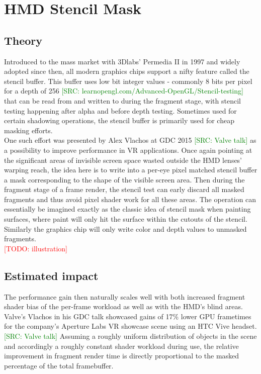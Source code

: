 
\section{HMD Stencil Mask} \label{stencilmask}
\subsection{Theory}
Introduced to the mass market with 3Dlabs' Permedia II in 1997 and widely adopted since then, all modern graphics chips support a nifty feature called the stencil buffer. This buffer uses low bit integer values - commonly 8 bits per pixel for a depth of 256 \textcolor{green}{[SRC: learnopengl.com/Advanced-OpenGL/Stencil-testing]} that can be read from and written to during the fragment stage, with stencil testing happening after alpha and before depth testing. Sometimes used for certain shadowing operations, the stencil buffer is primarily used for cheap masking efforts. \\
One such effort was presented by Alex Vlachos at GDC 2015 \textcolor{green}{[SRC: Valve talk]} as a possibility to improve performance in VR applications. Once again pointing at the significant areas of invisible screen space wasted outside the HMD lenses' warping reach, the idea here is to write into a per-eye pixel matched stencil buffer a mask corresponding to the shape of the visible screen area. Then during the fragment stage of a frame render, the stencil test can early discard all masked fragments and thus avoid pixel shader work for all these areas. The operation can essentially be imagined exactly as the classic idea of stencil mask when painting surfaces, where paint will only hit the surface within the cutouts of the stencil. Similarly the graphics chip will only write color and depth values to unmasked fragments. \\

\textcolor{red}{[TODO: illustration]}

\subsection{Estimated impact}
The performance gain then naturally scales well with both increased fragment shader bias of the per-frame workload as well as with the HMD's blind areas. Valve's Vlachos in his GDC talk showcased gains of 17\% lower GPU frametimes for the company's Aperture Labs VR showcase scene using an HTC Vive headset. \textcolor{green}{[SRC: Valve talk]}
Assuming a roughly uniform distribution of objects in the scene and accordingly a roughly constant shader workload during use, the relative improvement in fragment render time is directly proportional to the masked percentage of the total framebuffer. 


